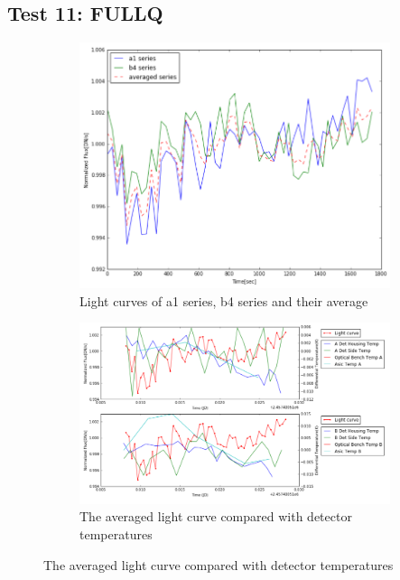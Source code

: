 \documentclass[conference]{IEEEtran}
\begin{document}
\subsection{Test 11: FULLQ} 
\begin{figure}[H]
    \centering
    \begin{subfigure}{1}
        \includegraphics[scale=0.4]{ts_test11}
        \caption{Light curves of a1 series, b4 series and their average}
    \end{subfigure}

    \begin{subfigure}{2}
        \includegraphics[scale=0.4]{temp_test11}
        \caption{The averaged light curve compared with detector temperatures}
    \end{subfigure}
   

\end{figure}
\end{document}
